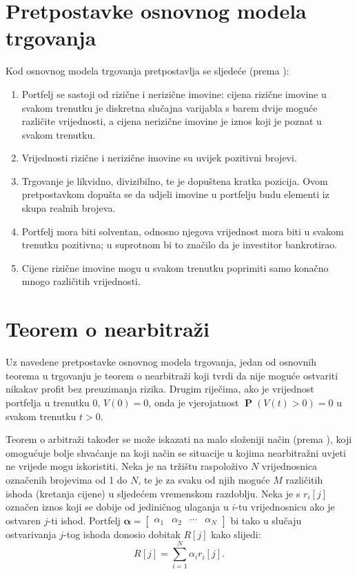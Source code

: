 \documentclass[lmodern, utf8, diplomski, numeric]{fer}
\newcommand{\matr}[1]{\mathbold{#1}}
\newcommand{\prob}[1]{\operatorname{\mathbf{P}}\q(#1\w)}
\newcommand{\q}{\left}
\newcommand{\w}{\right}
\begin{document}
  \section{Pretpostavke osnovnog modela trgovanja}
  Kod osnovnog modela trgovanja pretpostavlja se sljedeće (prema \citep{finmat}):
  \begin{enumerate}
    \item Portfelj se sastoji od rizične i nerizične imovine: cijena rizične imovine u svakom trenutku je diskretna slučajna varijabla s barem dvije moguće različite vrijednosti, a cijena nerizične imovine je iznos koji je poznat u svakom trenutku.
    
    \item Vrijednosti rizične i nerizične imovine su uvijek pozitivni brojevi.
    
    \item Trgovanje je likvidno, divizibilno, te je dopuštena kratka pozicija.
    Ovom pretpostavkom dopušta se da udjeli imovine u portfelju budu elementi iz skupa realnih brojeva.
    
    \item Portfelj mora biti solventan, odnosno njegova vrijednost mora biti u svakom trenutku pozitivna; u suprotnom bi to značilo da je investitor bankrotirao.
    
    \item Cijene rizične imovine mogu u svakom trenutku poprimiti samo konačno mnogo različitih vrijednosti.
  \end{enumerate}
  
  \section{Teorem o nearbitraži}
  Uz navedene pretpostavke osnovnog modela trgovanja, jedan od osnovnih teorema u trgovanju je teorem o nearbitraži koji tvrdi da nije moguće ostvariti nikakav profit bez preuzimanja rizika.
  Drugim riječima, ako je vrijednost portfelja u trenutku 0, $V\q(0\w) = 0$, onda je vjerojatnost $\prob{V\q(t\w) > 0} = 0$ u svakom trenutku $t > 0$.
  
  Teorem o arbitraži također se može iskazati na malo složeniji način (prema \citep{ross2011elementary}), koji omogućuje bolje shvaćanje na koji način se situacije u kojima nearbitražni uvjeti ne vrijede mogu iskoristiti.
  Neka je na tržištu raspoloživo $N$ vrijednosnica označenih brojevima od 1 do $N$, te je za svaku od njih moguće $M$ različitih ishoda (kretanja cijene) u sljedećem vremenskom razdoblju.
  Neka je s $r_i\q[j\w]$ označen iznos koji se dobije od jediničnog ulaganja u $i$-tu vrijednosnicu ako je ostvaren $j$-ti ishod.
  Portfelj $\matr{\alpha} = \begin{bmatrix} \alpha_1 & \alpha_2 & \cdots & \alpha_N
  \end{bmatrix}$ bi tako u slučaju ostvarivanja $j$-tog ishoda donosio dobitak $R\q[j\w]$ kako slijedi:
  \begin{equation*}
    R\q[j\w] = \sum_{i=1}^{N} \alpha_i r_i \q[j\w].
  \end{equation*}
  
\end{document}
